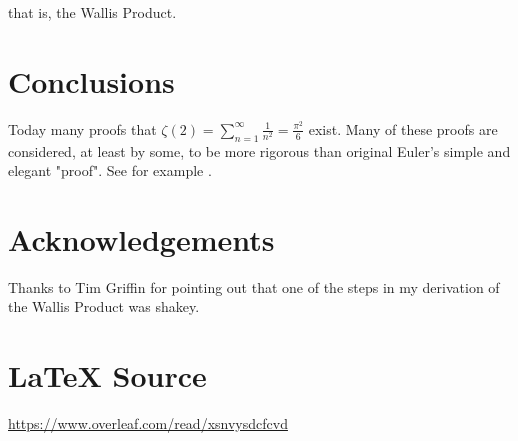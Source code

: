 \documentclass[11pt, oneside]{article}   	%
\begin{document}
\bigskip
\noindent
that is, the Wallis Product.

\section{Conclusions}
{
\doublespacing Today many proofs that ${\displaystyle \zeta(2) =
\sum\limits_{n=1}^\infty \frac{1}{n^2} = \frac{\pi^2}{6}}$
exist. Many of these proofs are considered, at least by some, to
be more rigorous than original Euler's simple and elegant
"proof". See for example \cite{proofwikibasels}. \par}

%
%
%
\section*{Acknowledgements}
Thanks to Tim Griffin for pointing out that one of the steps
in my derivation of the Wallis Product was shakey. 
%
%
\section*{\LaTeX \hspace{0.10 mm} Source}
\url{https://www.overleaf.com/read/xsnvysdcfcvd}
%
%
%


%
%
\end{document}
